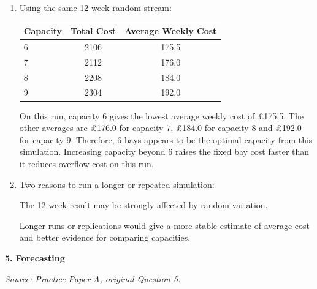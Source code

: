 \documentclass[11pt,a4paper]{article}
\begin{document}
\begin{enumerate}
\item Using the same 12-week random stream:

\begin{center}
\begin{tabular}{lcc}
\toprule
Capacity & Total Cost & Average Weekly Cost \\
\midrule
6 & 2106 & 175.5 \\
7 & 2112 & 176.0 \\
8 & 2208 & 184.0 \\
9 & 2304 & 192.0 \\
\bottomrule
\end{tabular}
\end{center}

On this run, capacity 6 gives the lowest average weekly cost of \pounds175.5. The other averages are \pounds176.0 for capacity 7, \pounds184.0 for capacity 8 and \pounds192.0 for capacity 9. Therefore, 6 bays appears to be the optimal capacity from this simulation. Increasing capacity beyond 6 raises the fixed bay cost faster than it reduces overflow cost on this run.

\item Two reasons to run a longer or repeated simulation:

The 12-week result may be strongly affected by random variation.

Longer runs or replications would give a more stable estimate of average cost and better evidence for comparing capacities.
\end{enumerate}

\newpage

\textbf{5. Forecasting}

\textit{Source: Practice Paper A, original Question 5.}
\end{document}
